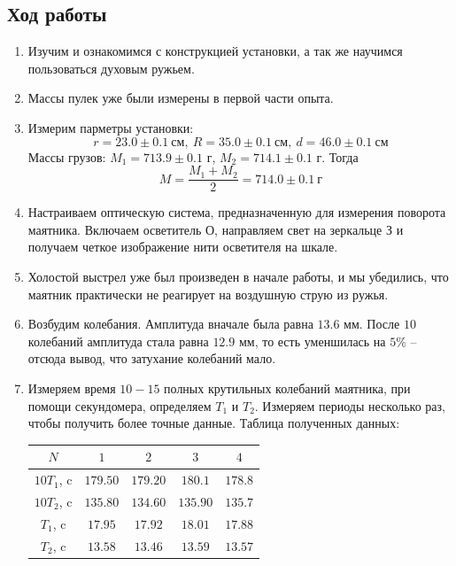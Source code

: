 \documentclass[a4paper,12pt]{article}
\begin{document}
\subsection*{Ход работы}
\begin{enumerate}
    \item Изучим и ознакомимся с конструкцией установки, а так же научимся пользоваться духовым ружьем.
    \item Массы пулек уже были измерены в первой части опыта.
    \item Измерим парметры установки:
    $$
    r = 23.0 \pm 0.1~\text{см},~R = 35.0 \pm 0.1~\text{см},~d = 46.0 \pm 0.1~\text{см}
    $$
    Массы грузов: $M_1 = 713.9 \pm 0.1$ г, $M_2 = 714.1 \pm 0.1$ г. Тогда
    $$
    M = \frac{M_1 + M_2}{2} = 714.0 \pm 0.1~\text{г}
    $$

    \item Настраиваем оптическую система, предназначенную для измерения поворота маятника. Включаем осветитель О, направляем свет на зеркальце З и получаем четкое изображение нити осветителя на шкале.
    \item Холостой выстрел уже был произведен в начале работы, и мы убедились, что маятник практически не реагирует на воздушную струю из ружья.
    \item Возбудим колебания. Амплитуда вначале была равна $13.6$ мм. После $10$ колебаний амплитуда стала равна $12.9$ мм, то есть уменшилась на $5\%$ -- отсюда вывод, что затухание колебаний мало.
    \item Измеряем время $10-15$ полных крутильных колебаний маятника, при помощи секундомера, определяем $T_1$ и $T_2$. Измеряем периоды несколько раз, чтобы получить более точные данные. Таблица полученных данных:
    \begin{table}[h]
        \centering
        \begin{tabular}{|c|c|c|c|c|} \hline 
            $N$ & $1$ & $2$ & $3$ & $4$ \\ \hline 
            $10T_1$, c& $179.50$ & $179.20$ & $180.1$ & $178.8$ \\ \hline 
            $10T_2$, c& $135.80$ & $134.60$ & $135.90$ & $135.7$ \\ \hline 
            $T_1$, c& $17.95$ & $17.92$ & $18.01$ & $17.88$ \\ \hline 
            $T_2$, c& $13.58$ & $13.46$ & $13.59$ & $13.57$ \\ \hline 
        \end{tabular} 
    \end{table}
    

\end{enumerate}
\end{document}
